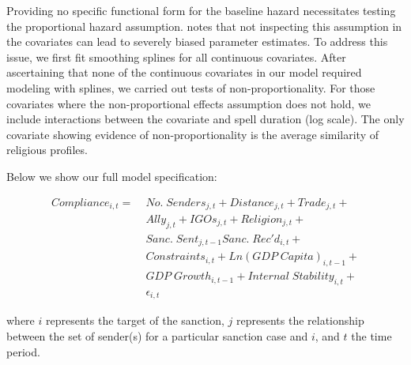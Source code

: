 Providing no specific functional form for the baseline hazard necessitates testing the proportional hazard assumption. \citet{keele2010proportionally} notes that not inspecting this assumption in the covariates can lead to severely biased parameter estimates. To address this issue, we first fit smoothing splines for all continuous covariates. After ascertaining that none of the continuous covariates in our model required modeling with splines, we carried out tests of non-proportionality. For those covariates where the non-proportional effects assumption does not hold, we include interactions between the covariate and spell duration (log scale). The only covariate showing evidence of non-proportionality is the average similarity of religious profiles.

Below we show our full model specification: 

\begin{align*}
		Compliance_{i,t} =\; & No. \; Senders_{j,t} + Distance_{j,t} + Trade_{j,t}  + \\
		 &Ally_{j,t} + IGOs_{j,t} + Religion_{j,t} +\\
 		 &Sanc. \; Sent_{j,t-1} Sanc. \; Rec'd_{i,t} + \\
		 &Constraints_{i,t} + Ln(GDP \; Capita)_{i,t-1} +\\
		 &GDP \; Growth_{i,t-1} + Internal \; Stability_{i,t} +\\
		 &\epsilon_{i,t}
	\end{align*}

where $i$ represents the target of the sanction, $j$ represents the relationship between the set of sender(s) for a particular sanction case and $i$, and $t$ the time period.